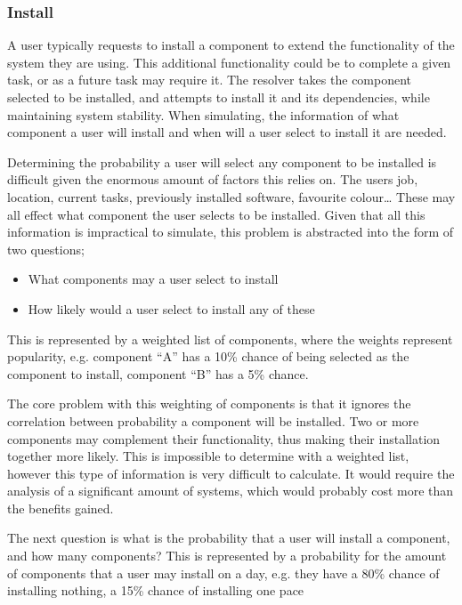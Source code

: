 \subsubsection{Install}
A user typically requests to install a component to extend the functionality of the system they are using.
This additional functionality could be to complete a given task, or as a future task may require it. 
The resolver takes the component selected to be installed, and attempts to install it and its dependencies, while maintaining system stability.
When simulating, the information of what component a user will install and when will a user select to install it are needed. 

Determining the probability a user will select any component to be installed is difficult given the enormous amount of factors this relies on.
The users job, location, current tasks, previously installed software, favourite colour\ldots 
These may all effect what component the user selects to be installed.
Given that all this information is impractical to simulate, this problem is abstracted into the form of two questions;
\begin{itemize}
  \item What components may a user select to install
  \item How likely would a user select to install any of these
\end{itemize}
This is represented by a weighted list of components, where the weights represent popularity,
e.g. component ``A'' has a 10\% chance of being selected as the component to install, component ``B'' has a 5\% chance.

The core problem with this weighting of components is that it ignores the correlation between probability a component will be installed. 
Two or more components may complement their functionality, thus making their installation together more likely.
This is impossible to determine with a weighted list, however this type of information is very difficult to calculate.
It would require the analysis of a significant amount of systems, which would probably cost more than the benefits gained.

The next question is what is the probability that a user will install a component, and how many components?
This is represented by a probability for the amount of components that a user may install on a day,
e.g. they have a 80\% chance of installing nothing, a 15\% chance of installing one pace

